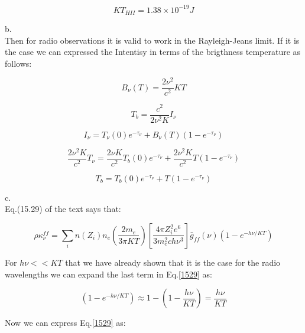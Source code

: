 \documentclass[12pt]{article}
\begin{document}
\begin{equation}
KT_{HII} = 1.38 \times 10^{-19} J
\end{equation}

b.\\

Then for radio observations it is valid to work in the Rayleigh-Jeans limit.
If it is the case we can expressed the Intentisy in terms of the brigthness 
temperature as follows:

\begin{equation}
B_{\nu}(T) = \dfrac{2\nu^2}{c^2}KT
\end{equation}

\begin{equation}
T_b = \dfrac{c^2}{2\nu^2K}I_{\nu}
\end{equation}

\begin{equation}
I_{\nu} = T_{\nu} (0)  e^{-\tau_{\nu}} + B_{\nu}(T)(1- e^{-\tau_{\nu}})
\end{equation}

\begin{equation}
\dfrac{2 \nu^2 K}{c^2} T_{\nu} = \dfrac{2 \nu K}{c^2}T_b(0)e^{-\tau_{\nu}} + \dfrac{2 \nu^2 K}{c^2} T(1 - e^{-\tau_{\nu}})
\end{equation}

\begin{equation}\label{T}
T_{b} = T_b (0)  e^{-\tau_{\nu}} + T(1- e^{-\tau_{\nu}}) 
\end{equation}

c.\\

Eq.(15.29) of the text says that:

\begin{equation}\label{1529}
\rho \kappa_{\nu}^{ff} = \sum_{i} n(Z_i) n_e \left( \dfrac{2m_e}{3\pi K T} \right)
\left[ \dfrac{4 \pi Z_i^2 e^6}{3 m_e^2 c h \nu^3} \right] \bar{g}_{ff}(\nu) 
\left( 1 - e^{-h\nu / KT}\right)
\end{equation}

For  $h \nu << KT$ that we have already shown that it is the case for the radio
wavelengths we can expand the last term in Eq.\ref{1529} as:

\begin{equation}\label{aprox}
\left( 1 - e^{-h\nu / KT}\right) \approx 1 - \left(1 - \dfrac{h \nu}{KT} \right)
= \dfrac{h \nu}{KT}
\end{equation}
  

Now we can express Eq.\ref{1529} as:
\end{document}

